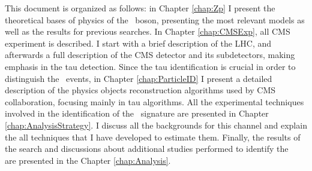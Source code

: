 This document is organized as follows: in Chapter \ref{chap:Zp} I present the theoretical bases of physics of 
the \Zprime~boson, presenting the most relevant models as well as the results for previous searches. In 
Chapter \ref{chap:CMSExp}, all CMS experiment is described. I start with a brief description 
of the LHC, and afterwards a full description of the CMS detector and its subdetectors, making emphasis 
in the tau detection. Since the tau identification is crucial in order to distinguish the \Zprime~events, in Chapter \ref{chap:ParticleID}
I present a detailed description of the physics objects reconstruction algorithms used
by CMS collaboration, focusing mainly in tau algorithms. All the experimental techniques involved in the 
identification of the \Zprimetotauh~signature are presented in Chapter \ref{chap:AnalysisStrategy}. 
I discuss all the backgrounds for this channel and explain the all techniques that I have developed 
to estimate them. Finally, the results of the search and discussions about additional studies performed to identify the \Zprime~ 
are presented in the Chapter \ref{chap:Analysis}.


